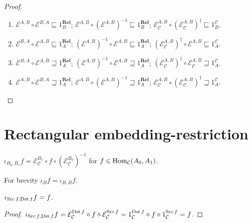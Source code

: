 \begin{proof}
  ~
  \begin{enumerate}
    \item $\mathcal{E}^{A,B} \circ \mathcal{E}^{B,A} \sqsubseteq
    1^{\mathbf{Rel}}_B$; $\mathcal{E}^{A,B} \circ (\mathcal{E}^{A,B})^{- 1} \sqsubseteq 1^{\mathbf{Rel}}_B$;
    $\mathcal{E}_{\mathcal{C}}^{A,B} \circ (\mathcal{E}_{\mathcal{C}}^{A,B})^{\dagger} \sqsubseteq 1^{\mathcal{C}}_B$.
    
    \item $\mathcal{E}^{B,A} \circ \mathcal{E}^{A,B} \sqsubseteq
    1^{\mathbf{Rel}}_A$; $(\mathcal{E}^{A,B})^{- 1} \circ \mathcal{E}^{A,B} \sqsubseteq 1^{\mathbf{Rel}}_A$;
    $(\mathcal{E}_{\mathcal{C}}^{A,B})^{\dagger} \circ \mathcal{E}^{A,B} \sqsubseteq 1^{\mathcal{C}}_A$.
    
    \item $\mathcal{E}^{B,A} \circ \mathcal{E}^{A,B} \sqsupseteq
    1^{\mathbf{Rel}}_A$; $(\mathcal{E}^{A,B})^{- 1} \circ \mathcal{E}^{A,B} \sqsupseteq 1^{\mathbf{Rel}}_A$;
    $(\mathcal{E}_{\mathcal{C}}^{A,B})^{\dagger} \circ \mathcal{E}_{\mathcal{C}}^{A,B} \sqsupseteq 1^{\mathcal{C}}_A$.
    
    \item $\mathcal{E}^{A,B} \circ \mathcal{E}^{B,A} \sqsupseteq
    1^{\mathbf{Rel}}_A$; $\mathcal{E}^{A,B} \circ (\mathcal{E}^{A,B})^{- 1} \sqsupseteq 1^{\mathbf{Rel}}_A$;
    $\mathcal{E}_{\mathcal{C}}^{A,B} \circ (\mathcal{E}_{\mathcal{C}}^{A,B})^{\dagger} \sqsupseteq 1^{\mathcal{C}}_A$.
  \end{enumerate}
\end{proof}

\section{Rectangular embedding-restriction}

\begin{defn}
  $\iota_{B_0, B_1} f = \mathcal{E}_{\mathcal{C}}^{B_1} \circ f \circ
  (\mathcal{E}_{\mathcal{C}}^{B_0})^{-1}$ for $f \in
  \operatorname{Hom}_{\mathcal{C}} (A_0 , A_1)$.
\end{defn}

For brevity $\iota_B f = \iota_{B, B} f$.

\begin{prop}
  $\iota_{\operatorname{Src} f, \operatorname{Dst} f} f = f$.
\end{prop}

\begin{proof}
  $\iota_{\operatorname{Src} f, \operatorname{Dst} f} f = \mathcal{E}_\mathcal{C}^{\operatorname{Dst} f} \circ f \circ \mathcal{E}_\mathcal{C}^{\operatorname{Src} f} =
  1_{\mathcal{C}}^{\operatorname{Dst} f} \circ f \circ 1_{\mathcal{C}}^{\operatorname{Src} f} = f$.
\end{proof}

